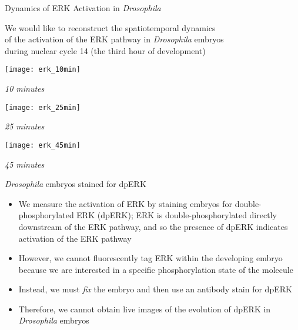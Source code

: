 \begin{frame}{Dynamics of ERK Activation in {\em Drosophila}}
	
	\centering
	We would like to reconstruct the spatiotemporal dynamics \\
	of the activation of the ERK pathway in {\em Drosophila} embryos\\
	during nuclear cycle 14 (the third hour of development)

    \centering
	\begin{minipage}{0.3\textwidth}
	    \texttt{[image: erk\_10min]}\\
	    {\scriptsize \em 10 minutes \par}
	\end{minipage}
	\begin{minipage}{0.3\textwidth}
	    \texttt{[image: erk\_25min]}\\
	    {\scriptsize \em 25 minutes \par}
	\end{minipage}
	\begin{minipage}{0.3\textwidth}
	    \texttt{[image: erk\_45min]}\\
	    {\scriptsize \em 45 minutes \par}
	\end{minipage}
	
	{\small {\em Drosophila} embryos stained for dpERK}
	
	\begin{itemize}
		\item We measure the activation of ERK by staining embryos for double-phosphorylated ERK (dpERK); ERK is double-phosphorylated  directly downstream of the ERK pathway, and so the presence of dpERK indicates activation of the ERK pathway
	
		\item However, we cannot fluorescently tag ERK within the developing embryo because we are interested in a specific phosphorylation state of the molecule
		
		\item Instead, we must {\em fix} the embryo and then use an antibody stain for dpERK
	
		\item Therefore, we cannot obtain live images of the evolution of dpERK in {\em Drosophila} embryos
	\end{itemize}
	
\end{frame}

